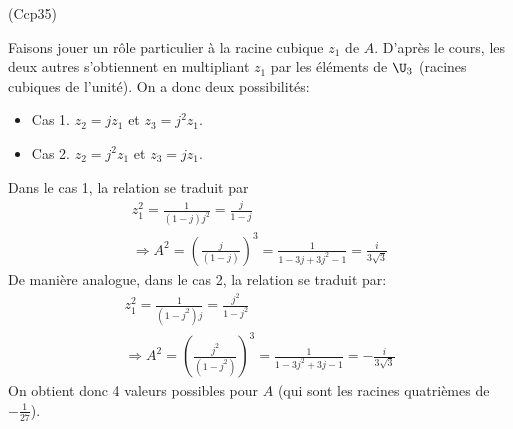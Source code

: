 \begin{tiny}(Ccp35)\end{tiny}
Faisons jouer un rôle particulier à la racine cubique $z_1$ de $A$. D'après le cours, les deux autres s'obtiennent en multipliant $z_1$ par les éléments de $\U_3$ (racines cubiques de l'unité). On a donc deux possibilités:
\begin{itemize}
  \item Cas 1. $z_2 = jz_1$ et $z_3=j^2z_1$.
  \item Cas 2. $z_2 = j^2z_1$ et $z_3=jz_1$.
\end{itemize}
Dans le cas 1, la relation se traduit par 
\begin{multline*}
  z_1^2 = \frac{1}{(1-j)j^2}=\frac{j}{1-j}\\
  \Rightarrow
  A^2 = \left(\frac{j}{(1-j)} \right)^3 = \frac{1}{1-3j+3j^2-1}=\frac{i}{3\sqrt{3}}
\end{multline*}
De manière analogue, dans le cas 2, la relation se traduit par:
\begin{multline*}
  z_1^2 = \frac{1}{(1-j^2)j}=\frac{j^2}{1-j^2} \\
  \Rightarrow
  A^2 = \left(\frac{j^2}{(1-j^2)} \right)^3 = \frac{1}{1-3j^2+3j-1}=-\frac{i}{3\sqrt{3}}
\end{multline*}
On obtient donc 4 valeurs possibles pour $A$ (qui sont les racines quatrièmes de $-\frac{1}{27}$).
